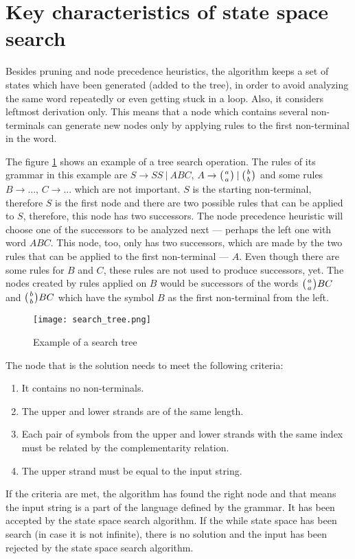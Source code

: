 \section{Key characteristics of state space search}
Besides pruning and node precedence heuristics, the algorithm keeps a set of states which have been generated (added to the tree), in order to avoid analyzing the same word repeatedly or even getting stuck in a loop. Also, it considers leftmost derivation only. This means that a node which contains several non-terminals can generate new nodes only by applying rules to the first non-terminal in the word.

The figure \ref{fig:search_tree} shows an example of a tree search operation. The rules of its grammar in this example are $S \rightarrow S S \:|\: A B C$, $A \rightarrow \wkpair{a}{a} \:|\: \wkpair{b}{b}$ and some rules $B \rightarrow ...$, $C \rightarrow ...$ which are not important. $S$ is the starting non-terminal, therefore $S$ is the first node and there are two possible rules that can be applied to $S$, therefore, this node has two successors. The node precedence heuristic will choose one of the successors to be analyzed next --- perhaps the left one with word $A B C$. This node, too, only has two successors, which are made by the two rules that can be applied to the first non-terminal --- $A$. Even though there are some rules for $B$ and $C$, these rules are not used to produce successors, yet. The nodes created by rules applied on $B$ would be successors of the words $\wkpair{a}{a} B C$ and $\wkpair{b}{b} B C$ which have the symbol $B$ as the first non-terminal from the left.

\begin{figure}[h]
  \centering
  \texttt{[image: search\_tree.png]}
  \caption{Example of a search tree}
  \label{fig:search_tree}
\end{figure}

The node that is the solution needs to meet the following criteria:
\begin{enumerate}
  \item{It contains no non-terminals.}
  \item{The upper and lower strands are of the same length.}
  \item{Each pair of symbols from the upper and lower strands with the same index must be related by the complementarity relation.}
  \item{The upper strand must be equal to the input string.}
\end{enumerate}
If the criteria are met, the algorithm has found the right node and that means the input string is a part of the language defined by the grammar. It has been accepted by the state space search algorithm. If the while state space has been search (in case it is not infinite), there is no solution and the input has been rejected by the state space search algorithm.

